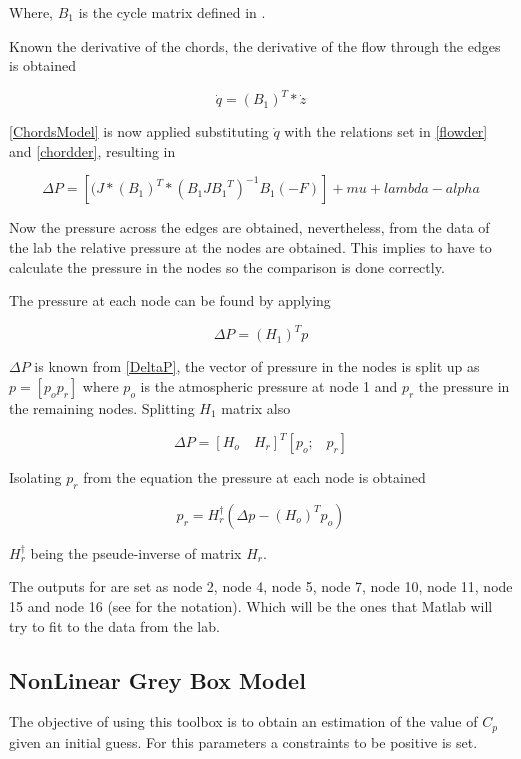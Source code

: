 Where, $B_1$ is the cycle matrix defined in . 

Known the derivative of the chords, the derivative of the flow through the edges is obtained

\begin{equation}
  \dot{q}  = (B_1)^T * \dot{z}
  \label{flowder}
\end{equation}

\eqref{ChordsModel} is now applied substituting $\dot{q}$ with the relations set in \eqref{flowder} and \eqref{chordder}, resulting in

\begin{equation}
  \Delta P = [(J*(B_1)^T * (B_1 J {B_1}^T)^{-1}B_1 (-F)]+mu+lambda-alpha
  \label{DeltaP}
\end{equation}

Now the pressure across the edges are obtained, nevertheless, from the data of the lab the relative pressure at the nodes are obtained. This implies to 
have to calculate the pressure in the nodes so the comparison is done correctly. 

The pressure at each node can be found by applying 

\begin{equation}
  \Delta P = (H_1)^T p
\end{equation}

$\Delta P$ is known from \eqref{DeltaP}, the vector of pressure in the nodes is split up as $p = [p_o p_r]$ where $p_o$ is the atmospheric pressure at 
node 1 and $p_r$ the pressure in the remaining nodes. Splitting $H_1$ matrix also

\begin{equation}
  \Delta P = [H_o \quad H_r]^T [p_o \text{;} \quad p_r]
\end{equation}

Isolating $p_r$ from the equation the pressure at each node is obtained

\begin{equation}
  p_r = H_r^{\dagger} (\Delta p - (H_o)^{T} p_o)
\end{equation}

$H_r^{\dagger}$ being the pseude-inverse of matrix $H_r$.

The outputs for are set as node 2, node 4, node 5, node 7, node 10, node 11, node 15 and node 16 (see  for the notation). Which will be the ones that Matlab will try to fit 
to the data from the lab. 

\subsection{NonLinear Grey Box Model}
The objective of using this toolbox is to obtain an estimation of the value of $C_p$ given an initial guess. For this parameters a constraints to be 
positive is set. 

